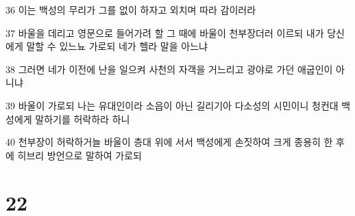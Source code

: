 \par 36 이는 백성의 무리가 그를 없이 하자고 외치며 따라 감이러라
\par 37 바울을 데리고 영문으로 들어가려 할 그 때에 바울이 천부장더러 이르되 내가 당신에게 말할 수 있느뇨 가로되 네가 헬라 말을 아느냐
\par 38 그러면 네가 이전에 난을 일으켜 사천의 자객을 거느리고 광야로 가던 애굽인이 아니냐
\par 39 바울이 가로되 나는 유대인이라 소읍이 아닌 길리기아 다소성의 시민이니 청컨대 백성에게 말하기를 허락하라 하니
\par 40 천부장이 허락하거늘 바울이 층대 위에 서서 백성에게 손짓하여 크게 종용히 한 후에 히브리 방언으로 말하여 가로되

\chapter{22}

